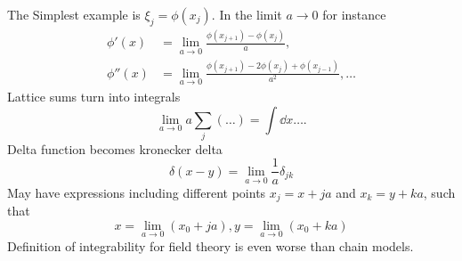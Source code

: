 The Simplest example is $\xi_j = \phi(x_j)$. In the limit $a\rightarrow 0$ for instance 
\begin{align*}
	\phi'(x) &= \lim_{a\rightarrow 0} \frac{\phi(x_{j+1}) - \phi(x_j)}{a}, \\
	\phi''(x) &= \lim_{a\rightarrow 0} \frac{\phi(x_{j+1}) - 2 \phi(x_j) + \phi(x_{j-1})}{a^2}, \dots
\end{align*}
Lattice sums turn into integrals
\begin{equation*}
	\lim_{a\rightarrow 0} a \sum_j (\dots) = \int \dd{x} \dots .
\end{equation*}
Delta function becomes kronecker delta
\begin{equation*}
	\delta(x-y) = \lim_{a\rightarrow 0} \frac{1}{a} \delta_{jk}
\end{equation*}
May have expressions including different points $x_j = x+ja$ and $x_k = y+ka$, such that 
\begin{equation*}
	x = \lim_{a\rightarrow 0} (x_0 + ja), y = \lim_{a\rightarrow 0} (x_0 + ka)
\end{equation*}
Definition of integrability for field theory is even worse than chain models.
